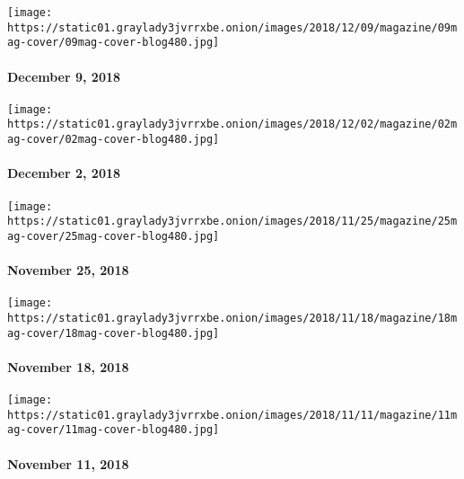 \href{https://www.nytimes3xbfgragh.onion/issue/magazine/2018/12/07/the-12918-issue}{}

\texttt{[image: https://static01.graylady3jvrrxbe.onion/images/2018/12/09/magazine/09mag-cover/09mag-cover-blog480.jpg]}

\hypertarget{december-9-2018}{%
\paragraph{December 9, 2018}\label{december-9-2018}}

\href{https://www.nytimes3xbfgragh.onion/issue/magazine/2018/12/07/the-12218-issue}{}

\texttt{[image: https://static01.graylady3jvrrxbe.onion/images/2018/12/02/magazine/02mag-cover/02mag-cover-blog480.jpg]}

\hypertarget{december-2-2018}{%
\paragraph{December 2, 2018}\label{december-2-2018}}

\href{https://www.nytimes3xbfgragh.onion/issue/magazine/2018/11/21/the-112518-issue}{}

\texttt{[image: https://static01.graylady3jvrrxbe.onion/images/2018/11/25/magazine/25mag-cover/25mag-cover-blog480.jpg]}

\hypertarget{november-25-2018}{%
\paragraph{November 25, 2018}\label{november-25-2018}}

\href{https://www.nytimes3xbfgragh.onion/issue/magazine/2018/11/16/the-111818-issue}{}

\texttt{[image: https://static01.graylady3jvrrxbe.onion/images/2018/11/18/magazine/18mag-cover/18mag-cover-blog480.jpg]}

\hypertarget{november-18-2018}{%
\paragraph{November 18, 2018}\label{november-18-2018}}

\href{https://www.nytimes3xbfgragh.onion/issue/magazine/2018/11/16/The-111118-issue}{}

\texttt{[image: https://static01.graylady3jvrrxbe.onion/images/2018/11/11/magazine/11mag-cover/11mag-cover-blog480.jpg]}

\hypertarget{november-11-2018}{%
\paragraph{November 11, 2018}\label{november-11-2018}}

